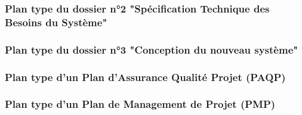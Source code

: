     \subsubsection{Plan type du dossier n°2 "Spécification Technique des Besoins du Système"}
    \subsubsection{Plan type du dossier n°3 "Conception du nouveau système"}
    \subsubsection{Plan type d'un Plan d'Assurance Qualité Projet (PAQP)}
    \subsubsection{Plan type d'un Plan de Management de Projet (PMP)}